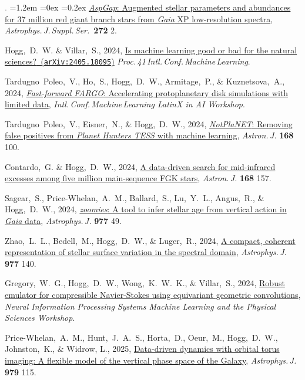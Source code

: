\documentclass[10pt,letterpaper]{article}
\newcommand{\project}[1]{\textsl{#1}}
\newcommand{\doi}[2]{\href{http://dx.doi.org/#1}{{#2}}}
\newcommand{\arxiv}[2]{\href{http://arxiv.org/abs/#1}{{#2}\ (\texttt{arXiv:#1})}}
\newcommand{\deemph}[1]{\textcolor{grey}{\footnotesize{#1}}}
\newcommand{\pubnumber}[1]{\deemph{{#1}.}}
\newcounter{refpubnum}
\newcommand{\hogglist}{%
    \rightmargin=0in
    \leftmargin=1.2em
    \topsep=0ex
    \partopsep=0pt
    \itemsep=0.2ex
    \parsep=0pt
    \itemindent=-1.0\leftmargin
    \listparindent=0.0\leftmargin
    \settowidth{\labelsep}{~}
    \usecounter{refpubnum}
  }
\begin{document}
\begin{list}{\pubnumber{\therefpubnum}}{\hogglist}
  \doi{10.3847/1538-4365/ad2b4d}{\project{AspGap}: Augmented stellar parameters and abundances for 37 million red giant branch stars from \project{Gaia} XP low-resolution spectra},
  \textit{Astrophys.\,J.\,Suppl.\,Ser.}\ \textbf{272} 2.  
\item
  Hogg,~D.~W. \& Villar,~S., 2024,
  \arxiv{2405.18095}{Is machine learning good or bad for the natural sciences?}
  \textit{Proc.\,41\,Intl.\,Conf.\,Machine\,Learning}.
\item
  Tardugno~Poleo,~V., Ho,~S., Hogg,~D.~W., Armitage,~P., \& Kuznetsova,~A., 2024,
  \href{https://openreview.net/pdf?id=TngdxtwFIn}{\project{Fast-forward FARGO}: Accelerating protoplanetary disk simulations with limited data},
  \textit{Intl.\,Conf.\,Machine\,Learning LatinX in AI Workshop}.
\item
  Tardugno~Poleo,~V., Eisner,~N., \& Hogg,~D.~W., 2024,
  \doi{10.3847/1538-3881/ad5f29}{\project{NotPlaNET}: Removing false positives from \project{Planet Hunters TESS} with machine learning},
  \textit{Astron.\,J.} \textbf{168} 100.
\item Contardo,~G. \& Hogg,~D.~W., 2024,
  \doi{10.3847/1538-3881/ad6b90}{A data-driven search for mid-infrared excesses among five million main-sequence FGK stars},
  \textit{Astron.\,J.} \textbf{168} 157.
\item Sagear,~S., Price-Whelan,~A.~M., Ballard,~S., Lu,~Y.~L., Angus,~R., \& Hogg,~D.~W., 2024,
  \doi{10.3847/1538-4357/ad8b26}{\project{zoomies}: A tool to infer stellar age from vertical action in \project{Gaia} data},
  \textit{Astrophys.\,J.} \textbf{977} 49.
\item Zhao,~L.~L., Bedell,~M., Hogg,~D.~W., \& Luger,~R., 2024,
  \doi{10.3847/1538-4357/ad90ad}{A compact, coherent representation of stellar surface variation in the spectral domain},
  \textit{Astrophys.\,J.} \textbf{977} 140.
\item Gregory,~W.~G., Hogg,~D.~W., Wong,~K.~W.~K., \& Villar,~S., 2024,
  \href{https://ml4physicalsciences.github.io/2024/files/NeurIPS_ML4PS_2024_176.pdf}{Robust emulator for compressible Navier-Stokes using equivariant geometric convolutions},
  \textit{Neural Information Processing Systems Machine Learning and the Physical Sciences Workshop}.
\item Price-Whelan,~A.~M., Hunt,~J.~A.~S., Horta,~D., Oeur,~M., Hogg,~D.~W., Johnston,~K., \& Widrow, L., 2025,
  \doi{10.3847/1538-4357/ad969a}{Data-driven dynamics with orbital torus imaging: A flexible model of the vertical phase space of the Galaxy},
  \textit{Astrophys.\,J.} \textbf{979} 115.

\end{list}
\end{document}
